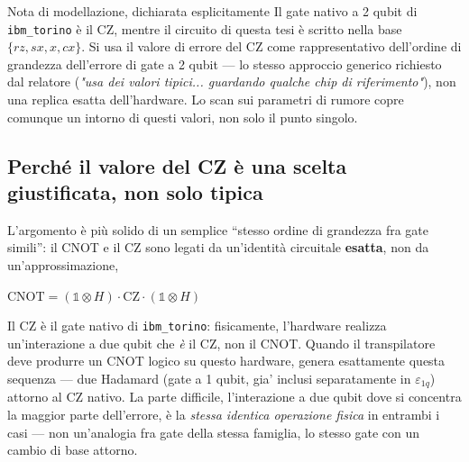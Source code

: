 \documentclass[11pt,a4paper]{article}
\begin{document}
\begin{okbox}{Nota di modellazione, dichiarata esplicitamente}
Il gate nativo a 2 qubit di \texttt{ibm\_torino} è il CZ, mentre il
circuito di questa tesi è scritto nella base $\{rz,sx,x,cx\}$. Si usa il
valore di errore del CZ come rappresentativo dell'ordine di grandezza
dell'errore di gate a 2 qubit --- lo stesso approccio generico richiesto
dal relatore (\emph{"usa dei valori tipici... guardando qualche chip di
riferimento"}), non una replica esatta dell'hardware. Lo scan sui
parametri di rumore copre comunque un intorno di questi valori, non solo
il punto singolo.
\end{okbox}

\subsection{Perché il valore del CZ è una scelta giustificata, non solo tipica}

L'argomento è più solido di un semplice ``stesso ordine di grandezza fra
gate simili'': il CNOT e il CZ sono legati da un'identità circuitale
\textbf{esatta}, non da un'approssimazione,
\begin{keyeq}
\centering
$\text{CNOT} = (\mathbb{1}\otimes H)\cdot\text{CZ}\cdot(\mathbb{1}\otimes H)$
\end{keyeq}
Il CZ è il gate nativo di \texttt{ibm\_torino}: fisicamente, l'hardware
realizza un'interazione a due qubit che \emph{è} il CZ, non il CNOT.
Quando il transpilatore deve produrre un CNOT logico su questo hardware,
genera esattamente questa sequenza --- due Hadamard (gate a 1 qubit,
gia' inclusi separatamente in $\varepsilon_{1q}$) attorno al CZ nativo.
La parte difficile, l'interazione a due qubit dove si concentra la
maggior parte dell'errore, è la \emph{stessa identica operazione fisica}
in entrambi i casi --- non un'analogia fra gate della stessa famiglia,
lo stesso gate con un cambio di base attorno.
\end{document}
